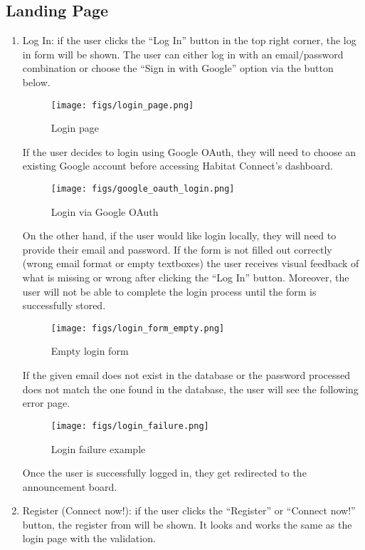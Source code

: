 \documentclass[conference]{IEEEtran}
\begin{document}
\subsection{Landing Page}
\begin{enumerate}
    \item Log In: if the user clicks the “Log In” button in the top right corner, the log in form will be shown. The user can either log in with an email/password combination or choose the “Sign in with Google” option via the button below.
    \begin{figure}[H]
    \centering
    \texttt{[image: figs/login\_page.png]}
    \caption{Login page}
    \label{fig:Login page}
    \end{figure}
    If the user decides to login using Google OAuth, they will need to choose an existing Google account before accessing Habitat Connect’s dashboard.
    \begin{figure}[H]
    \centering
    \texttt{[image: figs/google\_oauth\_login.png]}
    \caption{Login via Google OAuth}
    \label{fig:Google OAuth Login}
    \end{figure}
    On the other hand, if the user would like login locally, they will need to provide their email and password. If the form is not filled out correctly (wrong email format or empty textboxes) the user receives visual feedback of what is missing or wrong after clicking the “Log In” button. Moreover, the user will not be able to complete the login process until the form is successfully stored.
    \begin{figure}[H]
    \centering
    \texttt{[image: figs/login\_form\_empty.png]}
    \caption{Empty login form}
    \label{fig:Empty login form}
    \end{figure}
    If the given email does not exist in the database or the password processed does not match the one found in the database, the user will see the following error page.
    \begin{figure}[H]
    \centering
    \texttt{[image: figs/login\_failure.png]}
    \caption{Login failure example}
    \label{fig:Login failure example}
    \end{figure}
    Once the user is successfully logged in, they get redirected to the announcement board.
    \item Register (Connect now!): if the user clicks the “Register” or “Connect now!” button, the register from will be shown. It looks and works the same as the login page with the validation.
    \begin{figure}[H]

\end{figure}
\end{enumerate}
\end{document}
